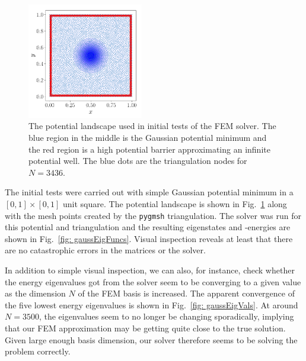 \documentclass[a4paper,12pt]{article}
\begin{document}
\begin{figure}
\vspace{-20pt}
\hspace{10pt}
\begin{center}
\includegraphics[width=0.45\textwidth]{../figs/gauss_pot.pdf}
\caption{The potential landscape used in initial tests of the FEM solver. The blue region in the middle is the Gaussian potential minimum and the red region is a high potential barrier approximating an infinite potential well. The blue dots are the triangulation nodes for $N=3436$. }
\label{fig: gaussPot}
\end{center}
\end{figure}
The initial tests were carried out with simple Gaussian potential minimum in a $[0,1]\times[0,1]$ unit square. The potential landscape is shown in Fig.~\ref{fig: gaussPot} along with the mesh points created by the \texttt{pygmsh} triangulation. The solver was run for this potential and triangulation and the resulting eigenstates and -energies are shown in Fig.~\ref{fig: gaussEigFuncs}. Visual inspection reveals at least that there are no catastrophic errors in the matrices or the solver.

In addition to simple visual inspection, we can also, for instance, check whether the energy eigenvalues got from the solver seem to be converging to a given value as the dimension $N$ of the FEM basis is increased. The apparent convergence of the five lowest energy eigenvalues is shown in Fig.~\ref{fig: gaussEigVals}. At around $N=3500$, the eigenvalues seem to no longer be changing sporadically, implying that our FEM approximation may be getting quite close to the true solution. Given large enough basis dimension, our solver therefore seems to be solving the problem correctly.
\end{document}
